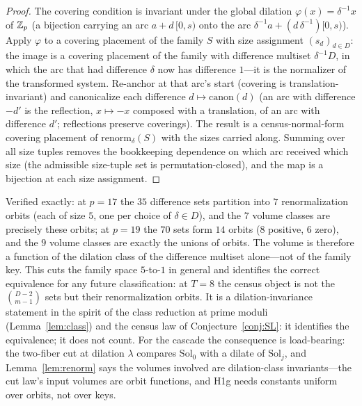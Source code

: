 \begin{proof}
The covering condition is invariant under the global dilation
$\varphi(x)=\delta^{-1}x$ of $\mathbb{Z}_p$ (a bijection carrying an arc
$a+d\,[0,s)$ onto the arc $\delta^{-1}a+(d\,\delta^{-1})[0,s)$). Apply
$\varphi$ to a covering placement of the family $S$ with size
assignment $(s_d)_{d\in D}$: the image is a covering placement of the
family with difference multiset $\delta^{-1}D$, in which the arc that
had difference $\delta$ now has difference $1$---it is the normalizer
of the transformed system. Re-anchor at that arc's start (covering is
translation-invariant) and canonicalize each difference
$d\mapsto\mathrm{canon}(d)$ (an arc with difference $-d'$ is the
reflection, $x\mapsto-x$ composed with a translation, of an arc with
difference $d'$; reflections preserve coverings). The result is a
census-normal-form covering placement of
$\mathrm{renorm}_\delta(S)$ with the sizes carried along. Summing over
all size tuples removes the bookkeeping dependence on which arc
received which size (the admissible size-tuple set is
permutation-closed), and the map is a bijection at each size
assignment.
\end{proof}

Verified exactly: at $p=17$ the $35$ difference sets partition into
$7$ renormalization orbits (each of size $5$, one per choice of
$\delta\in D$), and the $7$ volume classes are precisely these orbits;
at $p=19$ the $70$ sets form $14$ orbits ($8$ positive, $6$ zero), and
the $9$ volume classes are exactly the unions of orbits. The volume is
therefore a function of the dilation class of the difference multiset
alone---not of the family key. This cuts the family space $5$-to-$1$
in general and identifies the correct equivalence for any future
classification: at $T=8$ the census object is not the
$\binom{D-2}{m-1}$ sets but their renormalization orbits. It is a
dilation-invariance statement in the spirit of the class reduction at
prime moduli (Lemma~\ref{lem:class}) and the census law of
Conjecture~\ref{conj:SL}: it identifies the equivalence; it does not
count. For the cascade the consequence is load-bearing: the two-fiber
cut at dilation $\lambda$ compares $\mathrm{Sol}_0$ with a dilate of
$\mathrm{Sol}_j$, and Lemma~\ref{lem:renorm} says the volumes involved
are dilation-class invariants---the cut law's input volumes are orbit
functions, and H1g needs constants uniform over orbits, not over keys.

